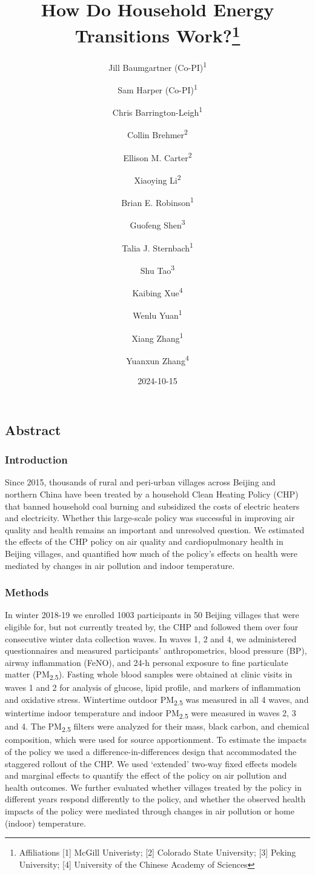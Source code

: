 \documentclass[
  letterpaper,
  DIV=11,
  numbers=noendperiod]{scrartcl}
\title{How Do Household Energy Transitions Work?\thanks{Affiliations
{[}1{]} McGill Univeristy; {[}2{]} Colorado State University; {[}3{]}
Peking University; {[}4{]} University of the Chinese Academy of
Sciences}}
\author{Jill Baumgartner (Co-PI)\textsuperscript{1} \and Sam Harper
(Co-PI)\textsuperscript{1} \and Chris
Barrington-Leigh\textsuperscript{1} \and Collin
Brehmer\textsuperscript{2} \and Ellison M.
Carter\textsuperscript{2} \and Xiaoying Li\textsuperscript{2} \and Brian
E. Robinson\textsuperscript{1} \and Guofeng
Shen\textsuperscript{3} \and Talia J.
Sternbach\textsuperscript{1} \and Shu
Tao\textsuperscript{3} \and Kaibing Xue\textsuperscript{4} \and Wenlu
Yuan\textsuperscript{1} \and Xiang Zhang\textsuperscript{1} \and Yuanxun
Zhang\textsuperscript{4}}
\date{2024-10-15}
\renewcommand*\contentsname{Table of contents}
\newcommand\contentsname{Table of contents}
\begin{document}
\maketitle

\renewcommand*\contentsname{Table of contents}
{
\hypersetup{linkcolor=}
\setcounter{tocdepth}{3}
\tableofcontents
}

\subsection*{Abstract}\label{abstract}

\subsubsection*{Introduction}\label{introduction}

Since 2015, thousands of rural and peri-urban villages across Beijing
and northern China have been treated by a household Clean Heating Policy
(CHP) that banned household coal burning and subsidized the costs of
electric heaters and electricity. Whether this large-scale policy was
successful in improving air quality and health remains an important and
unresolved question. We estimated the effects of the CHP policy on air
quality and cardiopulmonary health in Beijing villages, and quantified
how much of the policy's effects on health were mediated by changes in
air pollution and indoor temperature.

\subsubsection*{Methods}\label{methods}

In winter 2018-19 we enrolled 1003 participants in 50 Beijing villages
that were eligible for, but not currently treated by, the CHP and
followed them over four consecutive winter data collection waves. In
waves 1, 2 and 4, we administered questionnaires and measured
participants' anthropometrics, blood pressure (BP), airway inflammation
(FeNO), and 24-h personal exposure to fine particulate matter
(PM\textsubscript{2.5}). Fasting whole blood samples were obtained at
clinic visits in waves 1 and 2 for analysis of glucose, lipid profile,
and markers of inflammation and oxidative stress. Wintertime outdoor
PM\textsubscript{2.5} was measured in all 4 waves, and wintertime indoor
temperature and indoor PM\textsubscript{2.5} were measured in waves 2, 3
and 4. The PM\textsubscript{2.5} filters were analyzed for their mass,
black carbon, and chemical composition, which were used for source
apportionment. To estimate the impacts of the policy we used a
difference-in-differences design that accommodated the staggered rollout
of the CHP. We used `extended' two-way fixed effects models and marginal
effects to quantify the effect of the policy on air pollution and health
outcomes. We further evaluated whether villages treated by the policy in
different years respond differently to the policy, and whether the
observed health impacts of the policy were mediated through changes in
air pollution or home (indoor) temperature.
\end{document}
